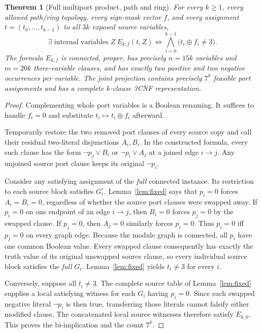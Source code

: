 \documentclass[11pt]{article}
\newtheorem{theorem}{Theorem}
\begin{document}
\begin{theorem}[Full multiport product, path and ring]\label{thm:joint}
For every $k\ge1$, every allowed path/ring topology, every sign-mask vector $f$, and \emph{every} assignment $t=(t_0,\ldots,t_{k-1})$ to all $3k$ exposed source variables,
\[
 \boxed{\quad
 \exists\text{ internal variables }Z\ E_{k,f}(t,Z)
 \iff\bigwedge_{i=0}^{k-1}\bigl(t_i\oplus f_i\ne3\bigr).
 \quad}
\]
The formula $E_{k,f}$ is connected, proper, has precisely $n=15k$ variables and $m=20k$ three-variable clauses, and has exactly two positive and two negative occurrences per variable. The joint projection contains precisely $7^k$ feasible port assignments and has a complete $k$-clause 3CNF representation.
\end{theorem}
\begin{proof}
Complementing whole port variables is a Boolean renaming. It suffices to handle $f_i=0$ and substitute $t_i\mapsto t_i\oplus f_i$ afterward.

Temporarily restore the two removed port clauses of every source copy and call their residual two-literal disjunctions $A_i,B_i$. In the constructed formula, every such clause has the form $\neg p_j\vee B_i$ or $\neg p_i\vee A_j$ at a joined edge $i\to j$. Any unjoined source port clause keeps its original $\neg p_i$.

Consider any satisfying assignment of the \emph{full} connected instance. Its restriction to each source block satisfies $G_i^\circ$. Lemma~\ref{lem:fixed} says that $p_i=0$ forces $A_i=B_i=0$, regardless of whether the source port clauses were swapped away. If $p_i=0$ on one endpoint of an edge $i\to j$, then $B_i=0$ forces $p_j=0$ by the swapped clause. If $p_j=0$, then $A_j=0$ similarly forces $p_i=0$. Thus $p_i=0$ iff $p_j=0$ on every graph edge. Because the module graph is connected, all $p_i$ have one common Boolean value. Every swapped clause consequently has exactly the truth value of its original unswapped source clause, so every individual source block satisfies the \emph{full} $G_i$. Lemma~\ref{lem:fixed} yields $t_i\ne3$ for every $i$.

Conversely, suppose all $t_i\ne3$. The complete source table of Lemma~\ref{lem:fixed} supplies a local satisfying witness for each $G_i$ having $p_i=0$. Since each swapped negative literal $\neg p_i$ is then true, transferring those literals cannot falsify either modified clause. The concatenated local source witnesses therefore satisfy $E_{k,0}$. This proves the bi-implication and the count $7^k$.


\end{proof}
\end{document}
